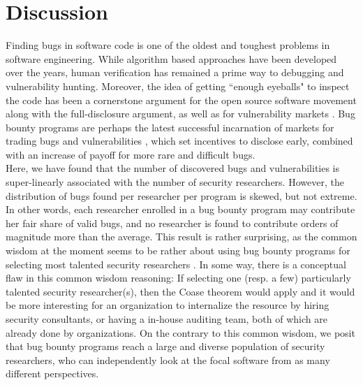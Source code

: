 \section{Discussion}
\label{sec:discussion}
Finding bugs in software code is one of the oldest and toughest problems in software engineering. While algorithm based approaches have been developed over the years, human verification has remained a prime way to debugging and vulnerability hunting. Moreover, the idea of getting ``enough eyeballs" to inspect the code has been a cornerstone argument for the open source software movement \cite{raymond1999cathedral} along with the full-disclosure argument, as well as for vulnerability markets \cite{bohme2006comparison}. Bug bounty programs are perhaps the latest successful incarnation of markets for trading bugs and vulnerabilities \cite{bohme2006comparison}, which set incentives to disclose early, combined with an increase of payoff for more rare and difficult bugs.\\

Here, we have found that the number of discovered bugs and vulnerabilities is super-linearly associated with the number of security researchers. However, the distribution of bugs found per researcher per program is skewed, but not extreme. In other words, each researcher enrolled in a bug bounty program may contribute her fair share of valid bugs, and no researcher is found to contribute orders of magnitude more than the average. This result is rather surprising, as the common wisdom at the moment seems to be rather about using bug bounty programs for selecting most talented security researchers \cite{moussouris2016}. In some way, there is a conceptual flaw in this common wisdom reasoning: If selecting one (resp. a few) particularly talented security researcher(s), then the Coase theorem would apply \cite{coase1937} and it would be more interesting for an organization to internalize the resource by hiring security consultants, or having a in-house auditing team, both of which are already done by organizations. On the contrary to this common wisdom, we posit that bug bounty programs reach a large and diverse population of security researchers, who can independently look at the focal software from as many different perspectives. \\

